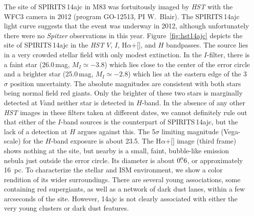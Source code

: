 \documentclass[twocolumn,times]{aastex6}
\newcommand{\HST}{{\it HST}}
\begin{document}
The site of SPIRITS\,14ajc in M83 was fortuitously imaged by \HST\/ with the
WFC3 camera in 2012 (program GO-12513, PI W.~Blair). 
The SPIRITS\,14ajc light curve suggests that the event was underway in 2012, 
although unfortunately there were no {\it Spitzer} observations in this year.
Figure~\ref{fig:hst14ajc} depicts the site of SPIRITS\,14ajc in the \HST\/ $V$, $I$, H$\alpha$+[], and $H$ bandpasses. 
The source lies in a very crowded stellar field with only modest extinction. In
the $I$-filter, there is a faint star (26.0\,mag, $M_I\simeq-3.8$) which lies close to the center of the
error circle and a brighter star (25.0\,mag, $M_I\simeq-2.8$) which lies at the eastern edge of the 3$\sigma$ position
uncertainty. The absolute magnitudes are consistent with both stars being normal field red
giants. Only the brighter of these two stars is marginally detected at $V$and neither star is detected in $H$-band. 
In the absence of any other \HST\/ images in these filters taken at different dates, we cannot definitely rule out that either of
the $I$-band sources is the counterpart of SPIRITS\,14ajc, but the lack of a detection at
$H$ argues against this. The 5$\sigma$ limiting magnitude (Vega-scale) for the
$H$-band exposure is about 23.5. The H$\alpha$+[] image (third frame)
shows nothing at the site, but nearby is a small, faint, bubble-like
emission nebula just outside the error circle. Its diameter is about $0\mbox{$.\!\!^{\prime\prime}$}6$,
or approximately 16~pc. To characterize the stellar and ISM environment, 
we show a color rendition of its wider surroundings.
There are several young associations, some containing red supergiants, as well as a network of dark dust
lanes, within a few arcseconds of the site. However, 14ajc is not clearly
associated with either the very young clusters or dark dust features.
\end{document}
